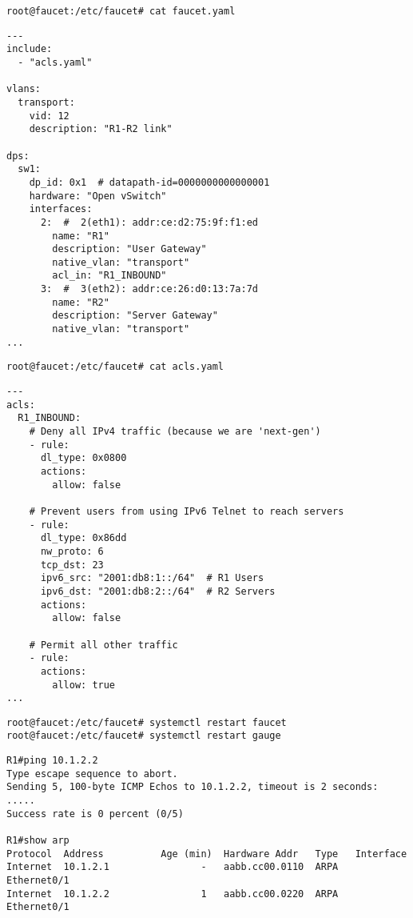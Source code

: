 \begin{verbatim}
root@faucet:/etc/faucet# cat faucet.yaml
\end{verbatim}

\begin{verbatim}
---
include:
  - "acls.yaml"

vlans:
  transport:
    vid: 12
    description: "R1-R2 link"

dps:
  sw1:
    dp_id: 0x1  # datapath-id=0000000000000001
    hardware: "Open vSwitch"
    interfaces:
      2:  #  2(eth1): addr:ce:d2:75:9f:f1:ed
        name: "R1"
        description: "User Gateway"
        native_vlan: "transport"
        acl_in: "R1_INBOUND"
      3:  #  3(eth2): addr:ce:26:d0:13:7a:7d
        name: "R2"
        description: "Server Gateway"
        native_vlan: "transport"
...
\end{verbatim}

\begin{verbatim}
root@faucet:/etc/faucet# cat acls.yaml
\end{verbatim}

\begin{verbatim}
---
acls:
  R1_INBOUND:
    # Deny all IPv4 traffic (because we are 'next-gen')
    - rule:
      dl_type: 0x0800
      actions:
        allow: false

    # Prevent users from using IPv6 Telnet to reach servers
    - rule:
      dl_type: 0x86dd
      nw_proto: 6
      tcp_dst: 23
      ipv6_src: "2001:db8:1::/64"  # R1 Users
      ipv6_dst: "2001:db8:2::/64"  # R2 Servers
      actions:
        allow: false

    # Permit all other traffic
    - rule:
      actions:
        allow: true
...
\end{verbatim}

\begin{verbatim}
root@faucet:/etc/faucet# systemctl restart faucet
root@faucet:/etc/faucet# systemctl restart gauge
\end{verbatim}

\begin{verbatim}
R1#ping 10.1.2.2
Type escape sequence to abort.
Sending 5, 100-byte ICMP Echos to 10.1.2.2, timeout is 2 seconds:
.....
Success rate is 0 percent (0/5)

R1#show arp
Protocol  Address          Age (min)  Hardware Addr   Type   Interface
Internet  10.1.2.1                -   aabb.cc00.0110  ARPA   Ethernet0/1
Internet  10.1.2.2                1   aabb.cc00.0220  ARPA   Ethernet0/1
\end{verbatim}

